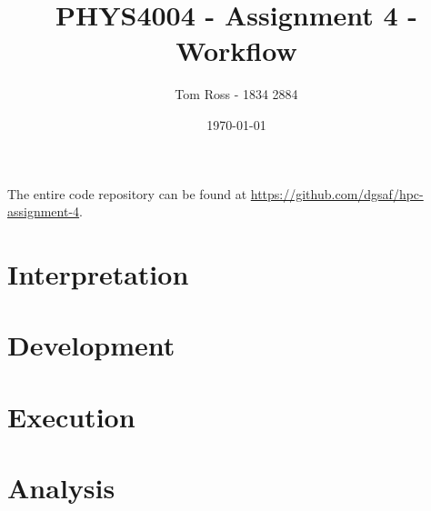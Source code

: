 \documentclass[draft]{article}
\title{PHYS4004 - Assignment 4 - Workflow}
\author{Tom Ross - 1834 2884}
\date{\today}
\begin{document}
The entire code repository can be found at
\url{https://github.com/dgsaf/hpc-assignment-4}.

\tableofcontents

\listoffigures

\listoftables

\clearpage

\section{Interpretation}
\label{sec:interpretation}

\section{Development}
\label{sec:development}

\section{Execution}
\label{sec:execution}

\section{Analysis}
\label{sec:analysis}
\end{document}
